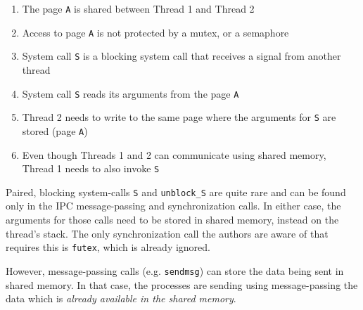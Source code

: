 \begin{enumerate}
    \item The page \texttt{A} is shared between Thread 1 and Thread 2
    \item Access to page \texttt{A} is not protected by a mutex, or a semaphore
    \item System call \texttt{S} is a blocking system call that receives a 
    signal from another thread
    \item System call \texttt{S} reads its arguments from the page \texttt{A}
    \item Thread 2 needs to write to the same page where the arguments for 
    \texttt{S} are stored (page \texttt{A})
    \item Even though Threads 1 and 2 can communicate using shared memory, 
    Thread 1 needs to also invoke \texttt{S}
\end{enumerate}

Paired, blocking system-calls \texttt{S} and \texttt{unblock\_S} are quite rare
and can be found only in the IPC message-passing and synchronization calls. In
either case, the arguments for those calls need to be stored in shared memory,
instead on the thread's stack. The only synchronization call the authors are
aware of that requires this is \texttt{futex}, which is already ignored.

However, message-passing calls (e.g. \texttt{sendmsg}) can store the data being
sent in shared memory. In that case, the processes are sending using
message-passing the data which is \emph{already available in the shared memory}.




